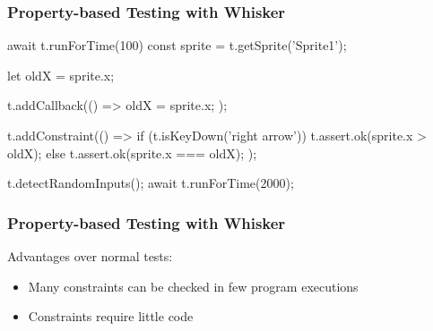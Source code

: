 \begin{frame}[fragile]\frametitle{Property-based Testing with Whisker}
    \begin{javascriptcode}
        await t.runForTime(100)
        const sprite = t.getSprite('Sprite1');

        let oldX = sprite.x;

        t.addCallback(() => {
            oldX = sprite.x;
        });

        t.addConstraint(() => {
            if (t.isKeyDown('right arrow')) {
                t.assert.ok(sprite.x > oldX);
            } else {
                t.assert.ok(sprite.x === oldX);
            }
        });

        t.detectRandomInputs();
        await t.runForTime(2000);
    \end{javascriptcode}
\end{frame}

\begin{frame}\frametitle{Property-based Testing with Whisker}
    Advantages over normal tests:
    \begin{itemize}
        \item Many constraints can be checked in \textcolor{upfim}{few program executions}
        \item Constraints require \textcolor{upfim}{little code}
    \end{itemize}
\end{frame}

%
%
%

